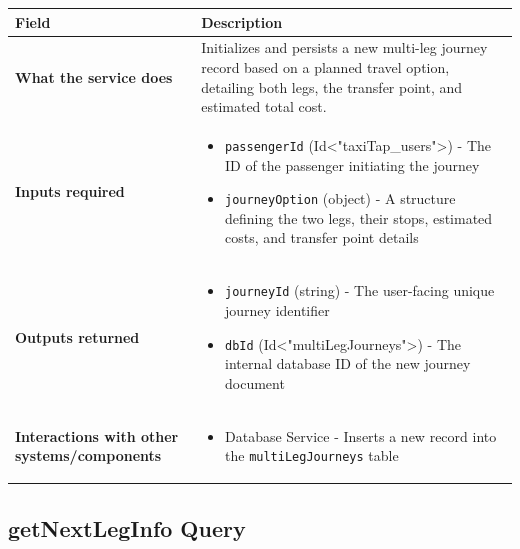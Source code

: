 \documentclass[11pt,a4paper]{article}
\begin{document}
\begin{longtable}{|p{4cm}|p{12cm}|}
\hline
\textbf{Field} & \textbf{Description} \\
\hline
\textbf{What the service does} & 
Initializes and persists a new multi-leg journey record based on a planned travel option, detailing both legs, the transfer point, and estimated total cost. \\
\hline
\textbf{Inputs required} & 
\begin{itemize}[nosep]
\item \texttt{passengerId} (Id<"taxiTap\_users">) - The ID of the passenger initiating the journey
\item \texttt{journeyOption} (object) - A structure defining the two legs, their stops, estimated costs, and transfer point details
\end{itemize} \\
\hline
\textbf{Outputs returned} & 
\begin{itemize}[nosep]
\item \texttt{journeyId} (string) - The user-facing unique journey identifier
\item \texttt{dbId} (Id<"multiLegJourneys">) - The internal database ID of the new journey document
\end{itemize} \\
\hline
\textbf{Interactions with other systems/components} & 
\begin{itemize}[nosep]
\item Database Service - Inserts a new record into the \texttt{multiLegJourneys} table
\end{itemize} \\
\hline
\end{longtable}

\subsection{getNextLegInfo Query}
\end{document}
